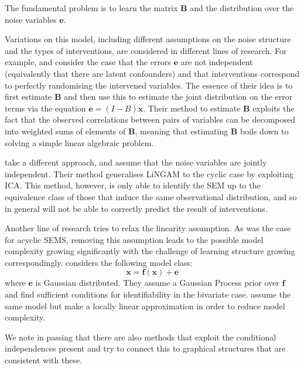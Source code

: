 The fundamental problem is to learn the matrix $\mathbf{B}$ and the distribution over the noise variables $\mathbf{e}$.


Variations on this model, including different assumptions on the noise structure and the types of interventions, are considered in different lines of research. 
For example, \cite{hyttinen2010causal} \cite{hyttinen2012learning} \cite{hyttinen2013discovering} and \cite{scheines2010combining} consider the case that the errors $\mathbf{e}$ are not independent (equivalently that there are latent confounders) and that interventions correspond to perfectly randomising the intervened variables. 
The essence of their idea is to first estimate $\mathbf{B}$ and then use this to estimate the joint distribution on the error terms via the equation $\mathbf{e} = (I-B)\mathbf{x}$. 
Their method to estimate $\mathbf{B}$ exploits the fact that the observed correlations between pairs of variables can be decomposed into weighted sums of elements of $\mathbf{B}$, meaning that estimating $\mathbf{B}$ boils down to solving a simple linear algebraic problem.

\cite{lacerda2012discovering} take a different approach, and assume that the noise variables are jointly independent. 
Their method generalises LiNGAM \cite{shimizu2006linear} to the cyclic case by exploiting ICA. 
This method, however, is only able to identify the SEM up to the equivalence class of those that induce the same observational distribution, and so in general will not be able to correctly predict the result of interventions.

Another line of research tries to relax the linearity assumption. 
As was the case for acyclic SEMS, removing this assumption leads to the possible model complexity growing significantly with the challenge of learning structure growing correspondingly. \cite{mooij2011causal} considers the following model class:
\[\mathbf{x} = \mathbf{f}(\mathbf{x}) + \mathbf{e}\] 
where $\mathbf{e}$ is Gaussian distributed. 
They assume a Gaussian Process prior over $\mathbf{f}$ and find sufficient conditions for identifiability in the bivariate case. \cite{mooij2013cyclic} assume the same model but make a locally linear approximation in order to reduce model complexity.


We note in passing that there are also methods \cite{richardson1996automated} \cite{richardson1996discovery} that exploit the conditional independences present and try to connect this to graphical structures that are consistent with these.



